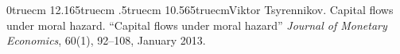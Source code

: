 %






\def\refshape{\parshape 2 0truecm 12.165truecm .5truecm
10.565truecm\noindent}


\def\book#1#2#3#4{\refshape #1. #2.  {\sl #3}. #4.}



\def\article#1#2#3#4#5{\refshape #1. #2. ``#3'' {\it #4},
#5.}


\def\contribution#1#2#3#4#5#6{\refshape #1. #2. ``#3.'' In #4
(eds.), {\it #5}. #6.}

\article{Viktor Tsyrennikov}{Capital flows under moral hazard}{Capital flows under moral hazard}{Journal of Monetary Economics}{60(1), 92--108, January 2013}

\def\pcontribution#1#2#3#4#5#6{\refshape #1. #2. ``#3.'' In #4
(eds.), {\it #5}. #6}


\def\ocontribution#1#2#3#4#5#6{\refshape #1. #2. ``#3.'' In #4
(ed.), {\it #5} #6.}


\def\mimeo#1#2#3#4{\refshape #1. #2. ``#3''  Mimeo. #4.}


